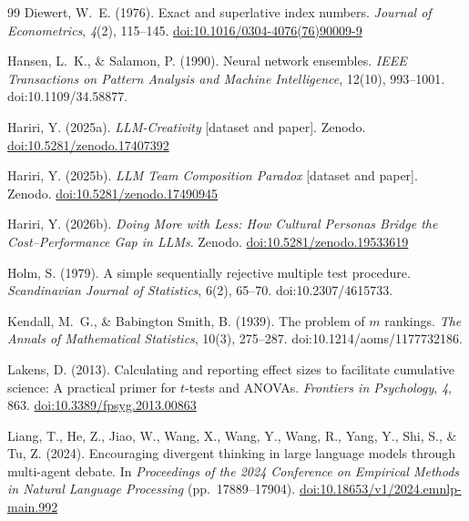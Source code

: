 \documentclass[12pt,a4paper]{article}
\begin{document}
\begin{thebibliography}{99}
Diewert, W.~E. (1976).
Exact and superlative index numbers.
\textit{Journal of Econometrics}, \textit{4}(2), 115--145.
\href{https://doi.org/10.1016/0304-4076(76)90009-9}{doi:10.1016/0304-4076(76)90009-9}

Hansen, L.~K., \& Salamon, P. (1990). Neural network ensembles.
\emph{IEEE Transactions on Pattern Analysis and Machine Intelligence},
12(10), 993--1001. doi:10.1109/34.58877.

Hariri, Y. (2025a).
\textit{LLM-Creativity} [dataset and paper]. Zenodo.
\href{https://doi.org/10.5281/zenodo.17407392}{doi:10.5281/zenodo.17407392}

Hariri, Y. (2025b).
\textit{LLM Team Composition Paradox} [dataset and paper]. Zenodo.
\href{https://doi.org/10.5281/zenodo.17490945}{doi:10.5281/zenodo.17490945}

Hariri, Y. (2026b).
\textit{Doing More with Less: How Cultural Personas Bridge the Cost--Performance
  Gap in LLMs}. Zenodo.
\href{https://doi.org/10.5281/zenodo.19533619}{doi:10.5281/zenodo.19533619}

Holm, S. (1979). A simple sequentially rejective multiple test procedure.
\emph{Scandinavian Journal of Statistics}, 6(2), 65--70.
doi:10.2307/4615733.

Kendall, M.~G., \& Babington Smith, B. (1939). The problem of $m$ rankings.
\emph{The Annals of Mathematical Statistics}, 10(3), 275--287.
doi:10.1214/aoms/1177732186.

Lakens, D. (2013).
Calculating and reporting effect sizes to facilitate cumulative science: A
  practical primer for $t$-tests and ANOVAs.
\textit{Frontiers in Psychology}, \textit{4}, 863.
\href{https://doi.org/10.3389/fpsyg.2013.00863}{doi:10.3389/fpsyg.2013.00863}

Liang, T., He, Z., Jiao, W., Wang, X., Wang, Y., Wang, R., Yang, Y., Shi, S.,
  \& Tu, Z. (2024).
Encouraging divergent thinking in large language models through multi-agent
  debate.
In \textit{Proceedings of the 2024 Conference on Empirical Methods in Natural
  Language Processing} (pp.~17889--17904).
\href{https://doi.org/10.18653/v1/2024.emnlp-main.992}{doi:10.18653/v1/2024.emnlp-main.992}


\end{thebibliography}
\end{document}
